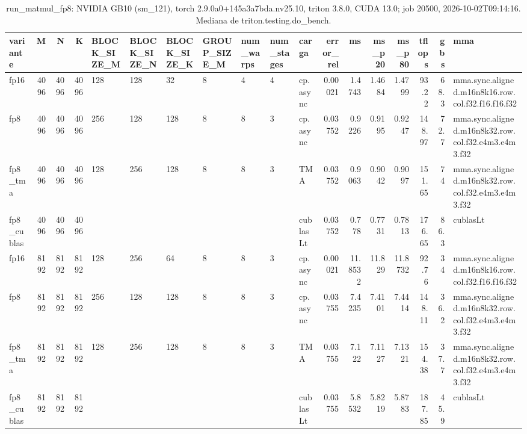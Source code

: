 \begin{table}[htbp]
  \centering\small
  \begin{tabular}{lrrrlllllllrrrrrrl}
    \toprule
    variante & M & N & K & BLOCK\_SIZE\_M & BLOCK\_SIZE\_N & BLOCK\_SIZE\_K & GROUP\_SIZE\_M & num\_warps & num\_stages & carga & error\_rel & ms & ms\_p20 & ms\_p80 & tflops & gbs & mma \\
    \midrule
    fp16 & 4096 & 4096 & 4096 & 128 & 128 & 32 & 8 & 4 & 4 & cp.async & 0.00021 & 1.4743 & 1.4684 & 1.4799 & 93.22 & 68.3 & mma.sync.aligned.m16n8k16.row.col.f32.f16.f16.f32 \\
    fp8 & 4096 & 4096 & 4096 & 256 & 128 & 128 & 8 & 8 & 3 & cp.async & 0.03752 & 0.9226 & 0.9195 & 0.9247 & 148.97 & 72.7 & mma.sync.aligned.m16n8k32.row.col.f32.e4m3.e4m3.f32 \\
    fp8\_tma & 4096 & 4096 & 4096 & 128 & 256 & 128 & 8 & 8 & 3 & TMA & 0.03752 & 0.9063 & 0.9042 & 0.9097 & 151.65 & 74 & mma.sync.aligned.m16n8k32.row.col.f32.e4m3.e4m3.f32 \\
    fp8\_cublas & 4096 & 4096 & 4096 &  &  &  &  &  &  & cublasLt & 0.03752 & 0.778 & 0.7731 & 0.7813 & 176.65 & 86.3 & cublasLt \\
    fp16 & 8192 & 8192 & 8192 & 128 & 256 & 64 & 8 & 8 & 3 & cp.async & 0.00021 & 11.8532 & 11.829 & 11.8732 & 92.76 & 34 & mma.sync.aligned.m16n8k16.row.col.f32.f16.f16.f32 \\
    fp8 & 8192 & 8192 & 8192 & 256 & 128 & 128 & 8 & 8 & 3 & cp.async & 0.03755 & 7.4235 & 7.4101 & 7.4414 & 148.11 & 36.2 & mma.sync.aligned.m16n8k32.row.col.f32.e4m3.e4m3.f32 \\
    fp8\_tma & 8192 & 8192 & 8192 & 128 & 256 & 128 & 8 & 8 & 3 & TMA & 0.03755 & 7.122 & 7.1127 & 7.1321 & 154.38 & 37.7 & mma.sync.aligned.m16n8k32.row.col.f32.e4m3.e4m3.f32 \\
    fp8\_cublas & 8192 & 8192 & 8192 &  &  &  &  &  &  & cublasLt & 0.03755 & 5.8532 & 5.8219 & 5.8783 & 187.85 & 45.9 & cublasLt \\
    \bottomrule
  \end{tabular}
  \caption{run\_matmul\_fp8: NVIDIA GB10 (sm\_121), torch 2.9.0a0+145a3a7bda.nv25.10, triton 3.8.0, CUDA 13.0; job 20500, 2026-10-02T09:14:16. Mediana de triton.testing.do\_bench.}
  \label{tab:run-matmul-fp8}
\end{table}
